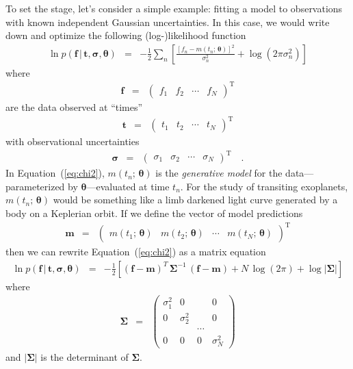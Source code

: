 \documentclass[12pt,preprint]{aastex}
\newcommand{\Eq}[1]{Equation~(\ref{eq:#1})}
\newcommand{\eq}[1]{\Eq{#1}}
\newcommand{\eqlabel}[1]{\label{eq:#1}}
\newcommand{\bvec}[1]{{\ensuremath{\boldsymbol{#1}}}}
\begin{document}
To set the stage, let's consider a simple example: fitting a model to
observations with known independent Gaussian uncertainties.
In this case, we would write down and optimize the following (log-)likelihood
function
\begin{eqnarray}\eqlabel{chi2}
\ln p(\bvec{f}\,|\,\bvec{t},\bvec{\sigma},\bvec{\theta}) &=&
-\frac{1}{2} \sum_n \left [ \frac{[f_n - m(t_n;\,\bvec{\theta})]^2}{\sigma_n^2}
+ \log (2\pi\sigma_n^2) \right ]
\end{eqnarray}
where
\begin{eqnarray}
\bvec{f} &=& \left ( \begin{array}{cccc}
f_1 & f_2 & \cdots & f_N
\end{array} \right )^\mathrm{T}
\end{eqnarray}
are the data observed at ``times''
\begin{eqnarray}
\bvec{t} &=& \left ( \begin{array}{cccc}
t_1 & t_2 & \cdots & t_N
\end{array} \right )^\mathrm{T}
\end{eqnarray}
with observational uncertainties
\begin{eqnarray}
\bvec{\sigma} &=& \left ( \begin{array}{cccc}
\sigma_1 & \sigma_2 & \cdots & \sigma_N
\end{array} \right )^\mathrm{T} \quad.
\end{eqnarray}
In \eq{chi2}, $m(t_n;\,\bvec{\theta})$ is the \emph{generative model} for the
data---parameterized by $\bvec{\theta}$---evaluated at time $t_n$.
For the study of transiting exoplanets, $m(t_n;\,\bvec{\theta})$ would be
something like a limb darkened light curve generated by a body on a Keplerian
orbit.
If we define the vector of model predictions
\begin{eqnarray}
\bvec{m} &=& \left ( \begin{array}{cccc}
m(t_1;\,\bvec{\theta}) & m(t_2;\,\bvec{\theta}) & \cdots & m(t_N;\,\bvec{\theta})
\end{array} \right )^\mathrm{T}
\end{eqnarray}
then we can rewrite \eq{chi2} as a matrix equation
\begin{eqnarray}\eqlabel{lnlike}
\ln p(\bvec{f}\,|\,\bvec{t},\bvec{\sigma},\bvec{\theta}) &=&
-\frac{1}{2}\left [
    (\bvec{f}-\bvec{m})^T\,\bvec{\Sigma}^{-1}\,(\bvec{f}-\bvec{m})
        + N\,\log (2\pi) + \log |\bvec{\Sigma}|
\right ]
\end{eqnarray}
where
\begin{eqnarray}
\bvec{\Sigma} &=& \left (\begin{array}{cccc}
\sigma_1^2 & 0 & & 0 \\
0 & \sigma_2^2 & & 0 \\
& & \cdots & \\
0 & 0 & 0 & \sigma_N^2
\end{array}\right )
\end{eqnarray}
and $|\bvec{\Sigma}|$ is the determinant of $\bvec{\Sigma}$.
\end{document}
